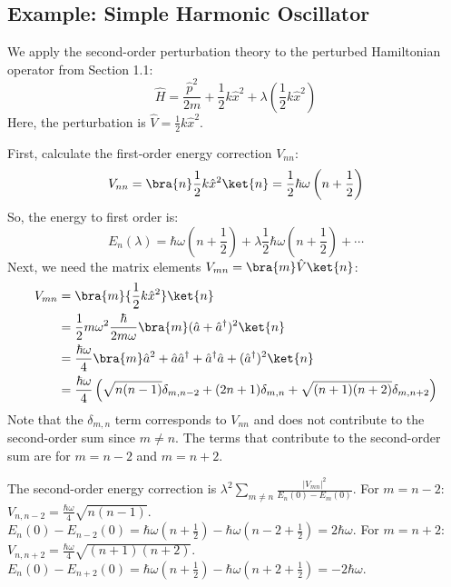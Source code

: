 \subsection{Example: Simple Harmonic Oscillator}
\begin{example}
    We apply the second-order perturbation theory to the perturbed
    Hamiltonian operator from Section 1.1:
    \begin{equation} \label{eq:sho_perturbed_H_lambda_V}
        \hat H = \frac{\hat p^2 }{2m} + \frac{1}{2}k\hat x^2 +
        \lambda \left(\frac{1}{2} k \hat x^2\right)
    \end{equation}
    Here, the perturbation is $\hat V = \frac{1}{2}k \hat x^2$.

    First, calculate the first-order energy correction $V_{nn}$:
    \begin{equation} \label{eq:sho_v_nn}
        V_{nn} = \bra{n}\frac{1}{2}k \hat x^2\ket{n} = \frac{1}{2}
        \hbar \omega \left(n + \frac{1}{2}\right)
    \end{equation}
    So, the energy to first order is:
    \begin{equation} \label{eq:sho_energy_first_order}
        E_n (\lambda) = \hbar \omega \left (n + \frac{1}{2}\right) +
        \lambda \frac{1}{2} \hbar \omega \left(n + \frac{1}{2}\right) + \cdots
    \end{equation}
    Next, we need the matrix elements $V_{mn} = \bra{m}\hat V\ket{n}$:
    \begin{align} \label{eq:sho_v_mn}
        V_{mn} &= \bra{m}{\frac{1}{2}k \hat x^2}\ket{n} \\
        &= \frac{1}{2} m \omega^2 \frac{\hbar}{2m\omega} \bra{m}(\hat
        a + \hat a^\dagger)^2 \ket{n} \notag \\
        &= \frac{\hbar \omega}{4} \bra{m}\hat a^2 + \hat a \hat
        a^\dagger + \hat a^\dagger \hat a + (\hat a^\dagger)^2 \ket{n} \notag \\
        &= \frac{\hbar \omega}{4} \left( \sqrt{n(n-1)}\delta_{m, n-2}
        + (2n+1)\delta_{m,n} + \sqrt{(n+1)(n+2)}\delta_{m,n+2}\right) \notag
    \end{align}
    Note that the $\delta_{m,n}$ term corresponds to $V_{nn}$ and
    does not contribute to the second-order sum since $m \ne n$. The
    terms that contribute to the second-order sum are for $m=n-2$ and $m=n+2$.

    The second-order energy correction is $\lambda^2 \sum_{m \ne n}
    \frac{|V_{mn}|^2}{E_n(0) - E_m(0)}$.
    For $m=n-2$: $V_{n,n-2} = \frac{\hbar \omega}{4}\sqrt{n(n-1)}$.
    $E_n(0) - E_{n-2}(0) = \hbar\omega(n+\frac{1}{2}) -
    \hbar\omega(n-2+\frac{1}{2}) = 2\hbar\omega$.
    For $m=n+2$: $V_{n,n+2} = \frac{\hbar
    \omega}{4}\sqrt{(n+1)(n+2)}$. $E_n(0) - E_{n+2}(0) =
    \hbar\omega(n+\frac{1}{2}) - \hbar\omega(n+2+\frac{1}{2}) = -2\hbar\omega$.


\end{example}
